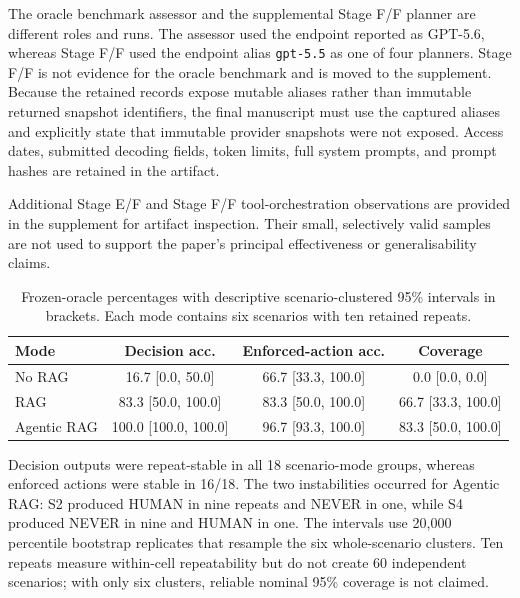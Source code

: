 The oracle benchmark assessor and the supplemental Stage F/F planner are
different roles and runs. The assessor used the endpoint reported as GPT-5.6,
whereas Stage F/F used the endpoint alias \texttt{gpt-5.5} as one of four
planners. Stage F/F is not evidence for the oracle benchmark and is moved to the
supplement. Because the retained records expose mutable aliases rather than
immutable returned snapshot identifiers, the final manuscript must use the
captured aliases and explicitly state that immutable provider snapshots were
not exposed. Access dates, submitted decoding fields, token limits, full system
prompts, and prompt hashes are retained in the artifact.

Additional Stage E/F and Stage F/F tool-orchestration observations are provided
in the supplement for artifact inspection. Their small, selectively valid
samples are not used to support the paper's principal effectiveness or
generalisability claims.


\begin{table}[t]
\centering
\caption{Frozen-oracle percentages with descriptive scenario-clustered 95\%
intervals in brackets. Each mode contains six scenarios with ten retained
repeats.}
\label{tab:oracle-clustered}
\scriptsize
\begin{tabular}{lccc}
\hline
Mode & Decision acc. & Enforced-action acc. & Coverage \\
\hline
No RAG & 16.7 [0.0, 50.0] & 66.7 [33.3, 100.0] & 0.0 [0.0, 0.0] \\
RAG & 83.3 [50.0, 100.0] & 83.3 [50.0, 100.0] & 66.7 [33.3, 100.0] \\
Agentic RAG & 100.0 [100.0, 100.0] & 96.7 [93.3, 100.0] & 83.3 [50.0, 100.0] \\
\hline
\end{tabular}
\end{table}

Decision outputs were repeat-stable in all 18 scenario-mode groups, whereas
enforced actions were stable in 16/18. The two instabilities occurred for
Agentic RAG: S2 produced HUMAN in nine repeats and NEVER in one, while S4
produced NEVER in nine and HUMAN in one. The intervals use 20,000 percentile
bootstrap replicates that resample the six whole-scenario clusters. Ten repeats
measure within-cell repeatability but do not create 60 independent scenarios;
with only six clusters, reliable nominal 95\% coverage is not claimed.

